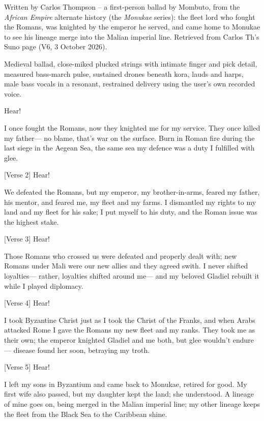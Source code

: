 %

\begin{notes}
Written by Carlos Thompson -- a first-person ballad by Mombuto, from the \emph{African Empire} alternate history (the \emph{Monukae} series): the fleet lord who fought the Romans, was knighted by the emperor he served, and came home to Monukae to see his lineage merge into the Malian imperial line. Retrieved from Carlos Th's Suno page (V6, 3 October 2026).
\end{notes}
\begin{style}
Medieval ballad, close-miked plucked strings with intimate finger and pick detail, measured bass-march pulse, sustained drones beneath kora, lauds and harps, male bass vocals in a resonant, restrained delivery using the user's own recorded voice.
\end{style}
\begin{lyrics}
[Verse 1]
Hear!

I once fought the Romans,
now they knighted me for my service.
They once killed my father—
no blame, that's war on the surface.
Burn in Roman fire
during the last siege in the Aegean Sea,
the same sea my defence
was a duty I fulfilled with glee.

[Verse 2]
Hear!

We defeated the Romans,
but my emperor, my brother-in-arms,
feared my father, his mentor,
and feared me, my fleet and my farms.
I dismantled my rights
to my land and my fleet for his sake;
I put myself to his duty,
and the Roman issue was the highest stake.

[Verse 3]
Hear!

Those Romans who crossed us
were defeated and properly dealt with;
new Romans under Mali
were our new allies and they agreed swith.
I never shifted loyalties—
rather, loyalties shifted around me—
and my beloved Gladiel
rebuilt it while I played diplomacy.

[Verse 4]
Hear!

I took Byzantine Christ
just as I took the Christ of the Franks,
and when Arabs attacked Rome
I gave the Romans my new fleet and my ranks.
They took me as their own;
the emperor knighted Gladiel and me both,
but glee wouldn't endure—
disease found her soon, betraying my troth.

[Verse 5]
Hear!

I left my sons in Byzantium
and came back to Monukae, retired for good.
My first wife also passed,
but my daughter kept the land; she understood.
A lineage of mine goes on,
being merged in the Malian imperial line;
my other lineage keeps the fleet
from the Black Sea to the Caribbean shine.
\end{lyrics}

